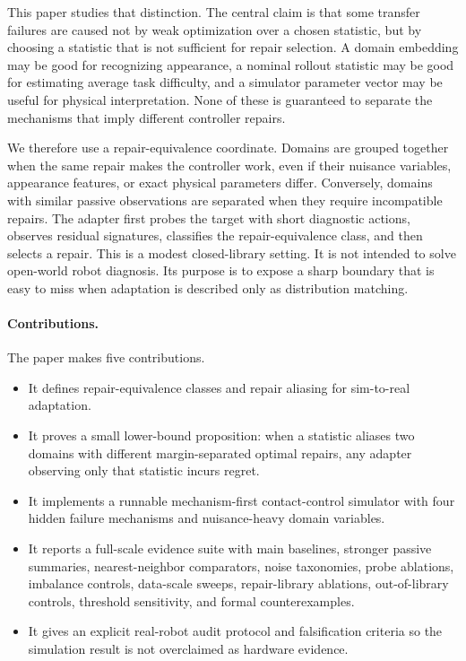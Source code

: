 \documentclass{article}
\begin{document}
This paper studies that distinction. The central claim is that some transfer
failures are caused not by weak optimization over a chosen statistic, but by
choosing a statistic that is not sufficient for repair selection. A domain
embedding may be good for recognizing appearance, a nominal rollout statistic may
be good for estimating average task difficulty, and a simulator parameter vector
may be useful for physical interpretation. None of these is guaranteed to
separate the mechanisms that imply different controller repairs.

We therefore use a repair-equivalence coordinate. Domains are grouped together
when the same repair makes the controller work, even if their nuisance variables,
appearance features, or exact physical parameters differ. Conversely, domains
with similar passive observations are separated when they require incompatible
repairs. The adapter first probes the target with short diagnostic actions,
observes residual signatures, classifies the repair-equivalence class, and then
selects a repair. This is a modest closed-library setting. It is not intended to
solve open-world robot diagnosis. Its purpose is to expose a sharp boundary that
is easy to miss when adaptation is described only as distribution matching.

\paragraph{Contributions.}
The paper makes five contributions.
\begin{itemize}
    \item It defines repair-equivalence classes and repair aliasing for
    sim-to-real adaptation.
    \item It proves a small lower-bound proposition: when a statistic aliases
    two domains with different margin-separated optimal repairs, any adapter
    observing only that statistic incurs regret.
    \item It implements a runnable mechanism-first contact-control simulator
    with four hidden failure mechanisms and nuisance-heavy domain variables.
    \item It reports a full-scale evidence suite with main baselines, stronger
    passive summaries, nearest-neighbor comparators, noise taxonomies, probe
    ablations, imbalance controls, data-scale sweeps, repair-library ablations,
    out-of-library controls, threshold sensitivity, and formal counterexamples.
    \item It gives an explicit real-robot audit protocol and falsification
    criteria so the simulation result is not overclaimed as hardware evidence.
\end{itemize}
\end{document}

